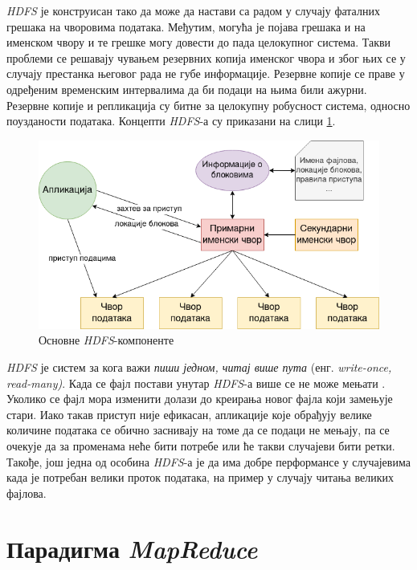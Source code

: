 \documentclass[12pt,oneside]{memoir}
\begin{document}
\textit{HDFS} је конструисан тако да може да настави са радом у случају фаталних грешака на чворовима података. Међутим, могућа је појава грешака и на именском чвору и те грешке могу довести до пада целокупног система. Такви проблеми се решавају чувањем резервних копија именског чвора и због њих се у случају престанка његовог рада не губе информације. Резервне копије се праве у одређеним временским интервалима да би подаци на њима били ажурни. Резервне копије и репликација су битне за целокупну робусност система, односно поузданости података. Концепти \textit{HDFS}-а су приказани на слици \ref{fig:hadoop_sistem}.

\begin{figure}[!ht]
  \centering
  \includegraphics[width=1\textwidth]{pictures/hdfs_components_basic.png}
  \caption{Основне \textit{HDFS}-компоненте}
  \label{fig:hadoop_sistem}
\end{figure}

\textit{HDFS} је систем за кога важи \textit{пиши једном, читај више пута} (енг. \textit{write-once, read-many)}. Када се фајл постави унутар \textit{HDFS}-а више се не може мењати \cite{hadoop_beginner}. Уколико се фајл мора изменити долази до креирања новог фајла који замењује стари. Иако такав приступ није ефикасан, апликације које обрађују велике количине података се обично заснивају на томе да се подаци не мењају, па се очекује да за променама неће бити потребе или ће такви случајеви бити ретки. Такође, још једна од особина \textit{HDFS}-а је да има добре перформансе у случајевима када је потребан велики проток података, на пример у случају читања великих фајлова.


\section{Парадигма \textit{MapReduce}}
\label{sec:mr}
\end{document}
